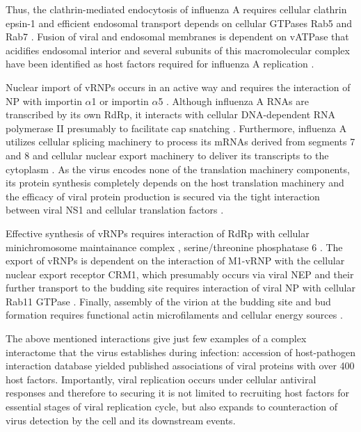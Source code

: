 	Thus, the clathrin-mediated endocytosis of influenza A requires cellular clathrin epsin-1 \parencite{Chen2008a} and efficient endosomal transport depends on cellular GTPases Rab5 and Rab7 \parencite{Sieczkarski2003}. Fusion of viral and endosomal membranes is dependent on \gls{vATPase} that acidifies endosomal interior and several subunits of this macromolecular complex have been identified as host factors required for influenza A replication \parencite{Watanabe2010}. 
	
	Nuclear import of \gls{vRNP}s occurs in an active way and requires the interaction of \gls{NP} with importin $\alpha$1 or importin $\alpha$5 \parencite{Cros2005}. Although influenza A RNAs are transcribed by its own \gls{RdRp}, it interacts with cellular DNA-dependent RNA polymerase II presumably to facilitate cap snatching \parencite{Engelhardt2005}. Furthermore, influenza A utilizes cellular splicing machinery to process its mRNAs derived from segments 7 and 8 \parencite{Dubois2014} and cellular nuclear export machinery to deliver its transcripts to the cytoplasm \parencite{York2013}. As the virus encodes none of the translation machinery components, its protein synthesis completely depends on the host translation machinery and the efficacy of viral protein production is secured via the tight interaction between viral \gls{NS1} and cellular translation factors \parencite{DelaLuna1995, Burgui2003, Aragon2000}.
	
	Effective synthesis of \gls{vRNP}s requires interaction of \gls{RdRp} with cellular minichromosome maintainance complex \parencite{Kawaguchi2007}, serine/threonine phosphatase 6 \parencite{York2014}. The export of \gls{vRNP}s is dependent on the interaction of \gls{M1}-\gls{vRNP} with the cellular nuclear export receptor CRM1, which presumably occurs via viral \gls{NEP} \parencite{Brunotte2014} and their further transport to the budding site requires interaction of viral \gls{NP} with cellular Rab11 GTPase \parencite{Eisfeld2011}. Finally, assembly of the virion at the budding site and bud formation requires functional actin microfilaments and cellular energy sources \parencite{Nayak2004}. 
	
	The above mentioned interactions give just few examples of a complex interactome that the virus establishes during infection: accession of host-pathogen interaction database  \parencite{Kumar2010} yielded published associations of viral proteins with over 400 host factors. Importantly, viral replication occurs under cellular antiviral responses and therefore to securing it is not limited to recruiting host factors for essential stages of viral replication cycle, but also expands to counteraction of virus detection by the cell and its downstream events. 
	
